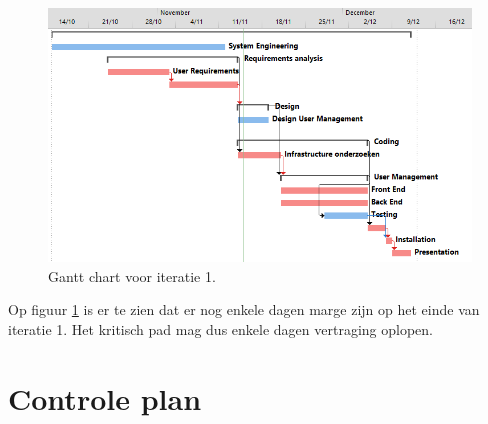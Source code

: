 \begin{figure} [H]
	\centering
	\includegraphics[width = \textwidth]{ManagerialProcess/GanttChartIT1.png}	
	\caption{Gantt chart voor iteratie 1.}
	\label{fig:GantChartIT1}
\end{figure}
Op figuur \ref{fig:GantChartIT1} is er te zien dat er nog enkele dagen marge zijn op het einde van iteratie 1. Het kritisch pad mag dus enkele dagen vertraging oplopen.

\section{Controle plan}
